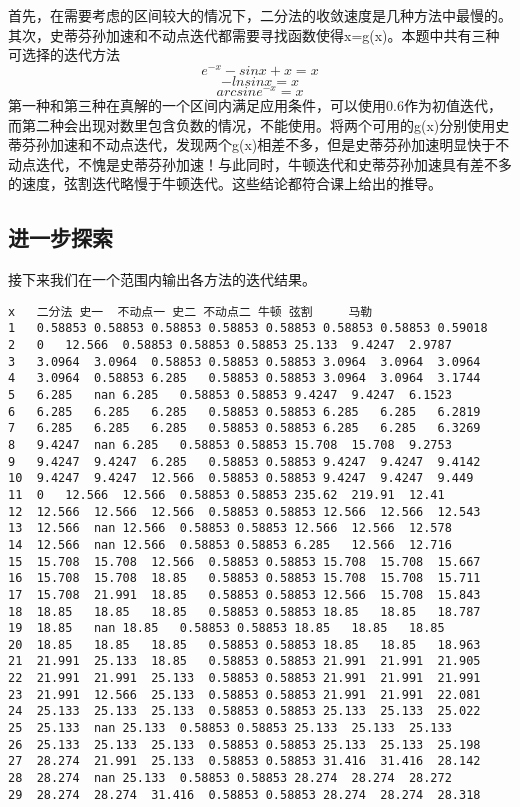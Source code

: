 \documentclass[a4paper,11pt,onecolumn,twoside]{article}
\begin{document}
\par 首先，在需要考虑的区间较大的情况下，二分法的收敛速度是几种方法中最慢的。其次，史蒂芬孙加速和不动点迭代都需要寻找函数使得x=g(x)。本题中共有三种可选择的迭代方法
$$e^{-x}-sinx+x=x$$$$-ln sin x=x$$$$arcsin e^{-x}=x$$第一种和第三种在真解的一个区间内满足应用条件，可以使用0.6作为初值迭代，而第二种会出现对数里包含负数的情况，不能使用。将两个可用的g(x)分别使用史蒂芬孙加速和不动点迭代，发现两个g(x)相差不多，但是史蒂芬孙加速明显快于不动点迭代，不愧是史蒂芬孙加速！与此同时，牛顿迭代和史蒂芬孙加速具有差不多的速度，弦割迭代略慢于牛顿迭代。这些结论都符合课上给出的推导。
\subsection{进一步探索}
接下来我们在一个范围内输出各方法的迭代结果。
\begin{lstlisting}
x	二分法	史一	不动点一 史二	不动点二 牛顿	弦割     马勒
1	0.58853	0.58853	0.58853	0.58853	0.58853	0.58853	0.58853	0.59018
2	0	12.566	0.58853	0.58853	0.58853	25.133	9.4247	2.9787
3	3.0964	3.0964	0.58853	0.58853	0.58853	3.0964	3.0964	3.0964
4	3.0964	0.58853	6.285	0.58853	0.58853	3.0964	3.0964	3.1744
5	6.285	nan	6.285	0.58853	0.58853	9.4247	9.4247	6.1523
6	6.285	6.285	6.285	0.58853	0.58853	6.285	6.285	6.2819
7	6.285	6.285	6.285	0.58853	0.58853	6.285	6.285	6.3269
8	9.4247	nan	6.285	0.58853	0.58853	15.708	15.708	9.2753
9	9.4247	9.4247	6.285	0.58853	0.58853	9.4247	9.4247	9.4142
10	9.4247	9.4247	12.566	0.58853	0.58853	9.4247	9.4247	9.449
11	0	12.566	12.566	0.58853	0.58853	235.62	219.91	12.41
12	12.566	12.566	12.566	0.58853	0.58853	12.566	12.566	12.543
13	12.566	nan	12.566	0.58853	0.58853	12.566	12.566	12.578
14	12.566	nan	12.566	0.58853	0.58853	6.285	12.566	12.716
15	15.708	15.708	12.566	0.58853	0.58853	15.708	15.708	15.667
16	15.708	15.708	18.85	0.58853	0.58853	15.708	15.708	15.711
17	15.708	21.991	18.85	0.58853	0.58853	12.566	15.708	15.843
18	18.85	18.85	18.85	0.58853	0.58853	18.85	18.85	18.787
19	18.85	nan	18.85	0.58853	0.58853	18.85	18.85	18.85
20	18.85	18.85	18.85	0.58853	0.58853	18.85	18.85	18.963
21	21.991	25.133	18.85	0.58853	0.58853	21.991	21.991	21.905
22	21.991	21.991	25.133	0.58853	0.58853	21.991	21.991	21.991
23	21.991	12.566	25.133	0.58853	0.58853	21.991	21.991	22.081
24	25.133	25.133	25.133	0.58853	0.58853	25.133	25.133	25.022
25	25.133	nan	25.133	0.58853	0.58853	25.133	25.133	25.133
26	25.133	25.133	25.133	0.58853	0.58853	25.133	25.133	25.198
27	28.274	21.991	25.133	0.58853	0.58853	31.416	31.416	28.142
28	28.274	nan	25.133	0.58853	0.58853	28.274	28.274	28.272
29	28.274	28.274	31.416	0.58853	0.58853	28.274	28.274	28.318

\end{lstlisting}
\end{document}
